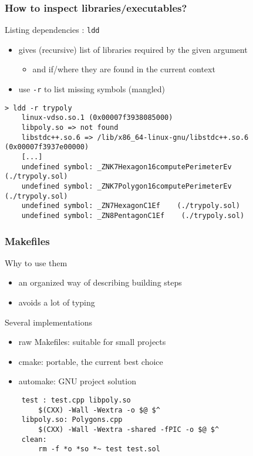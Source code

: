 \begin{frame}[fragile]
  \frametitle{How to inspect libraries/executables?}
  \begin{block}{Listing dependencies : \texttt{ldd}}
    \begin{itemize}
    \item gives (recursive) list of libraries required by the given argument
      \begin{itemize}
      \item and if/where they are found in the current context
      \end{itemize}
    \item use \texttt{-r} to list missing symbols (mangled)
    \end{itemize}
  \end{block}
  \small
  \begin{verbatim}
> ldd -r trypoly
    linux-vdso.so.1 (0x00007f3938085000)
    libpoly.so => not found
    libstdc++.so.6 => /lib/x86_64-linux-gnu/libstdc++.so.6 (0x00007f3937e00000)
    [...]
    undefined symbol: _ZNK7Hexagon16computePerimeterEv    (./trypoly.sol)
    undefined symbol: _ZNK7Polygon16computePerimeterEv    (./trypoly.sol)
    undefined symbol: _ZN7HexagonC1Ef    (./trypoly.sol)
    undefined symbol: _ZN8PentagonC1Ef    (./trypoly.sol)
  \end{verbatim}
\end{frame}

\begin{frame}[fragile]
  \frametitle{Makefiles}
  \begin{block}{Why to use them}
    \begin{itemize}
    \item an organized way of describing building steps
    \item avoids a lot of typing
    \end{itemize}
  \end{block}
  \begin{block}{Several implementations}
    \begin{itemize}
    \item raw Makefiles: suitable for small projects
    \item cmake: portable, the current best choice
    \item automake: GNU project solution
    \end{itemize}
  \end{block}
  \begin{verbatim}
    test : test.cpp libpoly.so
        $(CXX) -Wall -Wextra -o $@ $^
    libpoly.so: Polygons.cpp
        $(CXX) -Wall -Wextra -shared -fPIC -o $@ $^
    clean:
        rm -f *o *so *~ test test.sol
  \end{verbatim}
\end{frame}

